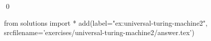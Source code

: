 
\begin{ex} 
  \label{ex:universal-turing-machine2}
  
  \qed
\end{ex} 
\begin{python0}
from solutions import *
add(label="ex:universal-turing-machine2",
    srcfilename='exercises/universal-turing-machine2/answer.tex') 
\end{python0}
